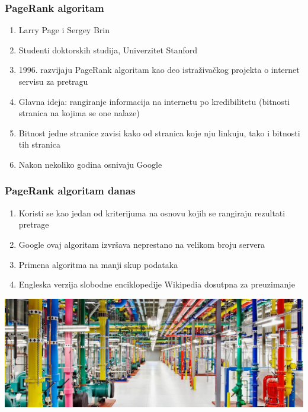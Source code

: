 \documentclass[11pt]{beamer}
\begin{document}
\begin{frame}
    \frametitle{PageRank algoritam}
  		\begin{center}
            \begin{enumerate}
                \item Larry Page i Sergey Brin 
                \item Studenti doktorskih studija, Univerzitet Stanford
                \item 1996. razvijaju PageRank algoritam kao deo istraživačkog projekta o internet servisu za pretragu
                \item Glavna ideja: rangiranje informacija na internetu po kredibilitetu (bitnosti stranica na kojima se one nalaze)
                \item Bitnost jedne stranice zavisi kako od stranica koje nju linkuju, tako i bitnosti tih stranica
                \item Nakon nekoliko godina osnivaju Google
            \end{enumerate}
        \end{center}
\end{frame}
\begin{frame}
    \frametitle{PageRank algoritam danas}
  		\begin{center}
            \begin{enumerate}
                \item Koristi se kao jedan od kriterijuma na osnovu kojih se rangiraju rezultati pretrage
                \item Google ovaj algoritam izvršava neprestano na velikom broju servera
                \item Primena algoritma na manji skup podataka
                \item Engleska verzija slobodne enciklopedije Wikipedia dosutpna za preuzimanje
            \end{enumerate}
        \includegraphics[width=0.8\columnwidth]{datacenter.jpg}
        \end{center}
\end{frame}
\end{document}
